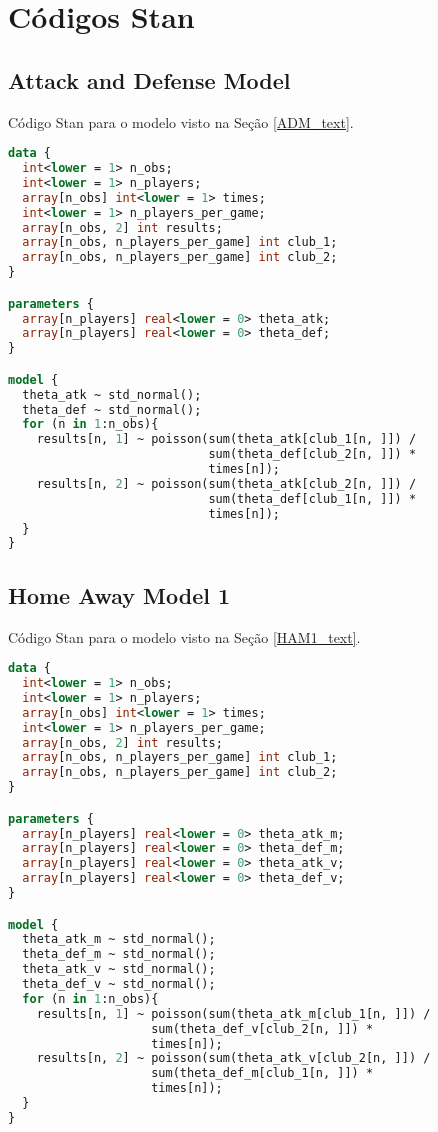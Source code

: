 \chapter{Códigos Stan}
\label{apendice}

\section{Attack and Defense Model}
\label{stan_model_1}

Código Stan para o modelo visto na Seção \ref{ADM_text}.

\begin{lstlisting}[language = Stan, firstnumber = 1]
data {
  int<lower = 1> n_obs;
  int<lower = 1> n_players;
  array[n_obs] int<lower = 1> times;
  int<lower = 1> n_players_per_game;
  array[n_obs, 2] int results;
  array[n_obs, n_players_per_game] int club_1;
  array[n_obs, n_players_per_game] int club_2;
}

parameters {
  array[n_players] real<lower = 0> theta_atk;
  array[n_players] real<lower = 0> theta_def;
}

model {
  theta_atk ~ std_normal();
  theta_def ~ std_normal();
  for (n in 1:n_obs){
    results[n, 1] ~ poisson(sum(theta_atk[club_1[n, ]]) /
                            sum(theta_def[club_2[n, ]]) *
                            times[n]);
    results[n, 2] ~ poisson(sum(theta_atk[club_2[n, ]]) /
                            sum(theta_def[club_1[n, ]]) *
                            times[n]);
  }
}
\end{lstlisting}

\section{Home Away Model 1}
\label{stan_model_2}

Código Stan para o modelo visto na Seção \ref{HAM1_text}.

\begin{lstlisting}[language = Stan, firstnumber = 1]
data {
  int<lower = 1> n_obs;
  int<lower = 1> n_players;
  array[n_obs] int<lower = 1> times;
  int<lower = 1> n_players_per_game;
  array[n_obs, 2] int results;
  array[n_obs, n_players_per_game] int club_1;
  array[n_obs, n_players_per_game] int club_2;
}

parameters {
  array[n_players] real<lower = 0> theta_atk_m;
  array[n_players] real<lower = 0> theta_def_m;
  array[n_players] real<lower = 0> theta_atk_v;
  array[n_players] real<lower = 0> theta_def_v;
}

model {
  theta_atk_m ~ std_normal();
  theta_def_m ~ std_normal();
  theta_atk_v ~ std_normal();
  theta_def_v ~ std_normal();
  for (n in 1:n_obs){
    results[n, 1] ~ poisson(sum(theta_atk_m[club_1[n, ]]) /
                    sum(theta_def_v[club_2[n, ]]) *
                    times[n]);
    results[n, 2] ~ poisson(sum(theta_atk_v[club_2[n, ]]) /
                    sum(theta_def_m[club_1[n, ]]) *
                    times[n]);
  }
}
\end{lstlisting}

